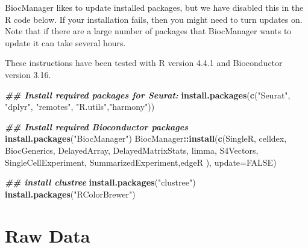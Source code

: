 \documentclass[
]{book}
\newenvironment{Shaded}{\begin{snugshade}}{\end{snugshade}}
\newcommand{\AttributeTok}[1]{\textcolor[rgb]{0.13,0.29,0.53}{#1}}
\newcommand{\ConstantTok}[1]{\textcolor[rgb]{0.56,0.35,0.01}{#1}}
\newcommand{\DocumentationTok}[1]{\textcolor[rgb]{0.56,0.35,0.01}{\textbf{\textit{#1}}}}
\newcommand{\FunctionTok}[1]{\textcolor[rgb]{0.13,0.29,0.53}{\textbf{#1}}}
\newcommand{\NormalTok}[1]{#1}
\newcommand{\SpecialCharTok}[1]{\textcolor[rgb]{0.81,0.36,0.00}{\textbf{#1}}}
\newcommand{\StringTok}[1]{\textcolor[rgb]{0.31,0.60,0.02}{#1}}
\begin{document}
BiocManager likes to update installed packages, but we have disabled this in the R code below. If your installation fails, then you might need to turn updates on. Note that if there are a large number of packages that BiocManager wants to update it can take several hours.

These instructions have been tested with R version 4.4.1 and Bioconductor version 3.16.

\begin{Shaded}
\begin{Highlighting}[]
\DocumentationTok{\#\# Install required packages for Seurat:}
\FunctionTok{install.packages}\NormalTok{(}\FunctionTok{c}\NormalTok{(}\StringTok{"Seurat"}\NormalTok{, }\StringTok{"dplyr"}\NormalTok{, }\StringTok{"remotes"}\NormalTok{, }\StringTok{"R.utils"}\NormalTok{,}\StringTok{"harmony"}\NormalTok{))}

\DocumentationTok{\#\# Install required Bioconductor packages}
\FunctionTok{install.packages}\NormalTok{(}\StringTok{"BiocManager"}\NormalTok{)}
\NormalTok{BiocManager}\SpecialCharTok{::}\FunctionTok{install}\NormalTok{(}\FunctionTok{c}\NormalTok{(}\StringTok{\textquotesingle{}SingleR\textquotesingle{}}\NormalTok{, }\StringTok{\textquotesingle{}celldex\textquotesingle{}}\NormalTok{,}
                       \StringTok{\textquotesingle{}BiocGenerics\textquotesingle{}}\NormalTok{, }\StringTok{\textquotesingle{}DelayedArray\textquotesingle{}}\NormalTok{, }\StringTok{\textquotesingle{}DelayedMatrixStats\textquotesingle{}}\NormalTok{,}
                       \StringTok{\textquotesingle{}limma\textquotesingle{}}\NormalTok{, }\StringTok{\textquotesingle{}S4Vectors\textquotesingle{}}\NormalTok{, }\StringTok{\textquotesingle{}SingleCellExperiment\textquotesingle{}}\NormalTok{,}
                       \StringTok{\textquotesingle{}SummarizedExperiment\textquotesingle{}}\NormalTok{,}\StringTok{\textquotesingle{}edgeR\textquotesingle{}}\NormalTok{ ),}
                     \AttributeTok{update=}\ConstantTok{FALSE}\NormalTok{)}


\DocumentationTok{\#\# install clustree}
\FunctionTok{install.packages}\NormalTok{(}\StringTok{"clustree"}\NormalTok{)}
\FunctionTok{install.packages}\NormalTok{(}\StringTok{"RColorBrewer"}\NormalTok{)}
\end{Highlighting}
\end{Shaded}

\hypertarget{raw-data}{%
\section{Raw Data}\label{raw-data}}
\end{document}
